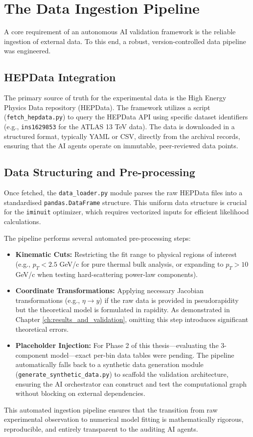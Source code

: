 \section{The Data Ingestion Pipeline}
A core requirement of an autonomous AI validation framework is the reliable ingestion of external data. To this end, a robust, version-controlled data pipeline was engineered.

\subsection{HEPData Integration}
The primary source of truth for the experimental data is the High Energy Physics Data repository (HEPData). The framework utilizes a script (\texttt{fetch\_hepdata.py}) to query the HEPData API using specific dataset identifiers (e.g., \texttt{ins1629853} for the ATLAS 13 TeV data). The data is downloaded in a structured format, typically YAML or CSV, directly from the archival records, ensuring that the AI agents operate on immutable, peer-reviewed data points.

\subsection{Data Structuring and Pre-processing}
Once fetched, the \texttt{data\_loader.py} module parses the raw HEPData files into a standardised \texttt{pandas.DataFrame} structure. This uniform data structure is crucial for the \texttt{iminuit} optimizer, which requires vectorized inputs for efficient likelihood calculations. 

The pipeline performs several automated pre-processing steps:
\begin{itemize}
    \item \textbf{Kinematic Cuts:} Restricting the fit range to physical regions of interest (e.g., $p_T < 2.5$ GeV/c for pure thermal bulk analysis, or expanding to $p_T > 10$ GeV/c when testing hard-scattering power-law components).
    \item \textbf{Coordinate Transformations:} Applying necessary Jacobian transformations (e.g., $\eta \to y$) if the raw data is provided in pseudorapidity but the theoretical model is formulated in rapidity. As demonstrated in Chapter \ref{ch:results_and_validation}, omitting this step introduces significant theoretical errors.
    \item \textbf{Placeholder Injection:} For Phase 2 of this thesis—evaluating the 3-component model—exact per-bin data tables were pending. The pipeline automatically falls back to a synthetic data generation module (\texttt{generate\_synthetic\_data.py}) to scaffold the validation architecture, ensuring the AI orchestrator can construct and test the computational graph without blocking on external dependencies.
\end{itemize}

This automated ingestion pipeline ensures that the transition from raw experimental observation to numerical model fitting is mathematically rigorous, reproducible, and entirely transparent to the auditing AI agents.
